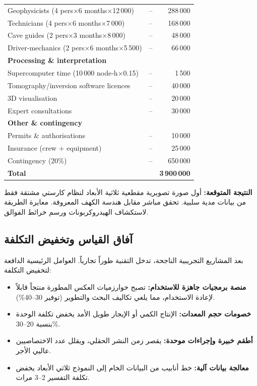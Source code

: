 \documentclass[12pt,a4paper]{article}
\theoremstyle{remark}
\begin{document}
\begin{otherlanguage}{english}
\begin{table}[htbp]
\begin{tabular}{lrr}
				Geophysicists (4 pers\(\times\)6 months\(\times\)12\,000) & – & 288\,000 \\
				Technicians (4 pers\(\times\)6 months\(\times\)7\,000) & – & 168\,000 \\
				Cave guides (2 pers\(\times\)3 months\(\times\)8\,000) & – & 48\,000 \\
				Driver‑mechanics (2 pers\(\times\)6 months\(\times\)5\,500) & – & 66\,000 \\
				\multicolumn{3}{l}{\textbf{Processing \& interpretation}} \\
				Supercomputer time (10\,000 node‑h\(\times\)0.15) & – & 1\,500 \\
				Tomography/inversion software licences & – & 40\,000 \\
				3D visualisation & – & 20\,000 \\
				Expert consultations & – & 30\,000 \\
				\multicolumn{3}{l}{\textbf{Other \& contingency}} \\
				Permits \& authorisations & – & 10\,000 \\
				Insurance (crew + equipment) & – & 25\,000 \\
				Contingency (20\%) & – & 650\,000 \\
				\midrule
				\textbf{Total} & & \textbf{3\,900\,000} \\
				\bottomrule
			\end{tabular}
		\end{table}
	\end{otherlanguage}
	
	\textbf{النتيجة المتوقعة:} أول صورة تصويرية مقطعية ثلاثية الأبعاد لنظام كارستي مشتقة فقط من بيانات مدية سلبية. تحقق مباشر مقابل هندسة الكهف المعروفة. معايرة الطريقة لاستكشاف الهيدروكربونات ورسم خرائط الفوالق.
	
	\subsection{آفاق القياس وتخفيض التكلفة}
	
	بعد المشاريع التجريبية الناجحة، تدخل التقنية طوراً تجارياً. العوامل الرئيسية الدافعة لتخفيض التكلفة:
	
	\begin{itemize}
		\item \textbf{منصة برمجيات جاهزة للاستخدام:} تصبح خوارزميات العكس المطورة منتجاً قابلاً لإعادة الاستخدام، مما يلغي تكاليف البحث والتطوير (توفير 30–40\%).
		\item \textbf{خصومات حجم المعدات:} الإنتاج الكمي أو الإيجار طويل الأمد يخفض تكلفة الوحدة بنسبة 20–30\%.
		\item \textbf{أطقم خبيرة وإجراءات موحدة:} يقصر زمن النشر الحقلي، ويقلل عدد الاختصاصيين عاليي الأجر.
		\item \textbf{معالجة بيانات آلية:} خط أنابيب من البيانات الخام إلى النموذج ثلاثي الأبعاد يخفض تكلفة التفسير 2–3 مرات.
	\end{itemize}
	
\end{document}

